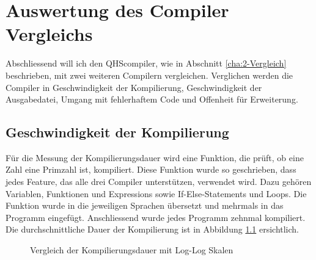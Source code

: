 \chapter{Auswertung des Compiler Vergleichs}
Abschliessend will ich den QHScompiler, wie in Abschnitt \ref{cha:2-Vergleich} beschrieben, mit zwei weiteren Compilern vergleichen.
Verglichen werden die Compiler in Geschwindigkeit der Kompilierung, Geschwindigkeit der Ausgabedatei, Umgang mit fehlerhaftem Code und Offenheit für Erweiterung. 

\section{Geschwindigkeit der Kompilierung} \label{sec:compare-compilespeed}
Für die Messung der Kompilierungsdauer wird eine Funktion, die prüft, ob eine Zahl eine Primzahl ist, kompiliert. Diese Funktion wurde so geschrieben, dass jedes Feature, das alle drei Compiler unterstützen, verwendet wird.
Dazu gehören Variablen, Funktionen und Expressions sowie If-Else-Statements und Loops. Die Funktion wurde in die jeweiligen Sprachen übersetzt und mehrmals in das Programm eingefügt. Anschliessend wurde jedes Programm zehnmal kompiliert.
Die durchschnittliche Dauer der Kompilierung ist in Abbildung \ref{fig:compilespeed} ersichtlich.

\begin{figure}[h!]
\centering
\label{fig:compilespeed}
\caption{Vergleich der Kompilierungsdauer mit Log-Log Skalen}
\end{figure}

